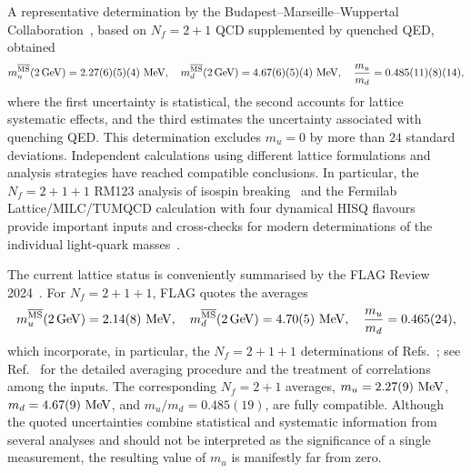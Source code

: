 \documentclass[review]{elsarticle}
\numberwithin{equation}{section}
\numberwithin{table}{section}
\numberwithin{figure}{section}
\begin{document}
A representative determination by the Budapest--Marseille--Wuppertal Collaboration~\cite{Fodor:2016bgu}, based on $N_f=2+1$ QCD supplemented by quenched QED, obtained
\begin{align}
    m_u^{\overline{\rm MS}}(2\,{\rm GeV})
    =2.27(6)(5)(4)\ {\rm MeV},
    \quad
    m_d^{\overline{\rm MS}}(2\,{\rm GeV})
    =4.67(6)(5)(4)\ {\rm MeV},
    \quad
    \frac{m_u}{m_d}
    =0.485(11)(8)(14),
    \label{eq:BMW-light-quark-masses}
\end{align}
where the first uncertainty is statistical, the second accounts for lattice systematic effects, and the third estimates the uncertainty associated with quenching QED. This determination excludes $m_u=0$ by more than $24$ standard deviations. Independent calculations using different lattice formulations and analysis strategies have reached compatible conclusions. In particular, the $N_f=2+1+1$ RM123 analysis of isospin breaking~\cite{Giusti:2017dmp} and the Fermilab Lattice/MILC/TUMQCD calculation with four dynamical HISQ flavours~\cite{FermilabLattice:2018est} provide important inputs and cross-checks for modern determinations of the individual light-quark masses~\cite{FlavourLatticeAveragingGroupFLAG:2024oxs}.

The current lattice status is conveniently summarised by the FLAG Review 2024~\cite{FlavourLatticeAveragingGroupFLAG:2024oxs}. For $N_f=2+1+1$, FLAG quotes the averages
\begin{align}
    m_u^{\overline{\rm MS}}(2\,{\rm GeV})=2.14(8)\ {\rm MeV},
    \quad
    m_d^{\overline{\rm MS}}(2\,{\rm GeV})=4.70(5)\ {\rm MeV},
    \quad 
    \frac{m_u}{m_d}=0.465(24),
    \label{eq:FLAG-light-quark-masses}
\end{align}
which incorporate, in particular, the $N_f=2+1+1$ determinations of Refs.~\cite{Giusti:2017dmp,FermilabLattice:2018est}; see Ref.~\cite{FlavourLatticeAveragingGroupFLAG:2024oxs} for the detailed averaging procedure and the treatment of correlations among the inputs. The corresponding $N_f=2+1$ averages,
$m_u=2.27(9)\ {\rm MeV}$, $m_d=4.67(9)\ {\rm MeV}$, and $m_u/m_d=0.485(19)$, are fully compatible. Although the quoted uncertainties combine statistical and systematic information from several analyses and should not be interpreted as the significance of a single measurement, the resulting value of $m_u$ is manifestly far from zero.
\end{document}
